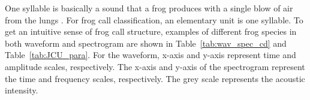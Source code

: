 One syllable is basically a sound that a frog produces with a single blow of air from the lungs \citep{huang2009frog}. For frog call classification, an elementary unit is one syllable. 
To get an intuitive sense of frog call structure, examples of different frog species in both waveform and spectrogram are shown in Table~\ref{tab:wav_spec_cd} and Table~\ref{tab:JCU_para}. For the waveform, x-axis and y-axis represent time and amplitude scales, respectively. The x-axis and y-axis of the spectrogram represent the time and frequency scales, respectively. The grey scale represents the acoustic intensity. 


%
%









